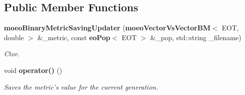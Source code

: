 \subsection*{Public Member Functions}
\begin{CompactItemize}
\item 
{\bf moeo\-Binary\-Metric\-Saving\-Updater} ({\bf moeo\-Vector\-Vs\-Vector\-BM}$<$ EOT, double $>$ \&\_\-metric, const {\bf eo\-Pop}$<$ EOT $>$ \&\_\-pop, std::string \_\-filename)
\begin{CompactList}\small\item\em Ctor. \item\end{CompactList}\item 
void {\bf operator()} ()\label{classmoeoBinaryMetricSavingUpdater_2d051d28def4cadf69957c8a21bf88dc}

\begin{CompactList}\small\item\em Saves the metric's value for the current generation. \item\end{CompactList}\end{CompactItemize}
